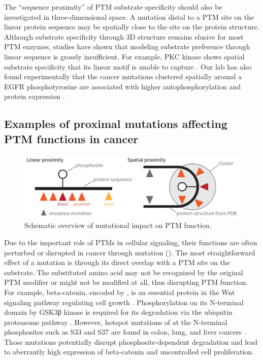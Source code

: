 The ``sequence proximity'' of PTM substrate specificity should also be investigated in three-dimensional space. A mutation distal to a PTM site on the linear protein sequence may be spatially close to the site on the protein structure. Although substrate specificity through 3D structure remains elusive for most PTM enzymes, studies have shown that modeling substrate preference through linear sequence is grossly insufficient. For example, PKC kinase shows spatial substrate specificity that its linear motif is unable to capture \cite{duarteml_schechtmand:ProteinFolding2014}. Our lab has also found experimentally that the cancer mutations clustered spatially around a EGFR phosphotyrosine are associated with higher autophosphorylation and protein expression \cite{niub_dingl:ProteinstructureguidedDiscovery2016}.


\subsection{Examples of proximal mutations affecting PTM functions in cancer}
\begin{figure}[tb]
    \centering
    \includegraphics[width=0.9\linewidth]{figures/chap01_intro/ptm_mutational_impact.pdf}
    \caption{Schematic overview of mutational impact on PTM function.}
    \label{fig:intro-ptm-mut-impact}
\end{figure}

Due to the important role of PTMs in cellular signaling, their functions are often perturbed or disrupted in cancer through mutation (). The most straightforward effect of a mutation is through its direct overlap with a PTM site on the substrate. The substituted amino acid may not be recognized by the original PTM modifier or might not be modified at all, thus disrupting PTM function. For example, beta-catenin, encoded by , is an essential protein in the Wnt signaling pathway regulating cell growth \cite{gaoc_zhangw:ExonMutations2017}. Phosphorylation on its N-terminal domain by GSK3β kinase is required for its degradation via the ubiquitin proteasome pathway \cite{millerjr_moonrt:SignalTransduction1996}. However, hotspot mutations of  at the N-terminal phosphosites such as S33 and S37 are found in colon, lung, and liver cancers \cite{gaoc_zhangw:ExonMutations2017}. Those mutations potentially disrupt phosphosite-dependent degradation and lead to aberrantly high expression of beta-catenin and uncontrolled cell proliferation.

